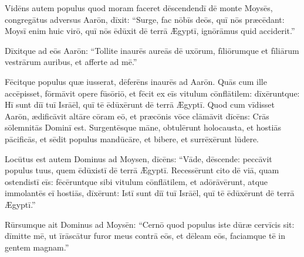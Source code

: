 Vidēns autem populus quod moram faceret dēscendendī dē monte
Moysēs, congregātus adversus Aarōn, dīxit: ``Surge, fac nōbīs deōs, quī
nōs præcēdant: Moysī enim huic
virō, quī nōs ēdūxit dē terrā Ægyptī, ignōrāmus quid acciderit.''

Dīxitque
ad eōs Aarōn: ``Tollite inaurēs aureās dē uxōrum,
fīliōrumque et fīliārum vestrārum auribus, et afferte ad mē.''

Fēcitque
populus quæ iusserat, dēferēns inaurēs
ad Aarōn. 
Quās cum ille accēpisset, fōrmāvit opere fūsōriō, et fēcit ex
eīs vitulum cōnflātilem: dīxēruntque: Hī
sunt dīī tuī Isrāēl, quī tē ēdūxērunt dē terrā Ægyptī. 
Quod cum vīdisset Aarōn, ædificāvit altāre cōram eō, et
præcōnis vōce clāmāvit dīcēns: Crās sōlemnitās Dominī est. 
Surgentēsque māne, obtulērunt
holocausta, et hostiās
pācificās, et sēdit populus
mandūcāre, et bibere, et surrēxērunt lūdere. 

Locūtus est
autem Dominus ad Moysen, dīcēns: ``Vāde, dēscende:
peccāvit populus tuus, quem
ēdūxistī dē terrā Ægyptī. 
Recessērunt cito dē viā, quam ostendistī eīs:
fēcēruntque sibi vitulum cōnflātilem, et adōrāvērunt, atque
immolantēs eī hostiās, dīxērunt: Istī
sunt dīī tuī Isrāēl, quī tē ēdūxērunt dē terrā Ægyptī.'' 

Rūrsumque ait Dominus ad Moysēn: ``Cernō quod populus iste
dūræ cervīcis sit: 
dīmitte mē, ut īrāscātur furor meus contrā
eōs, et dēleam eōs, faciamque tē in gentem magnam.'' 

